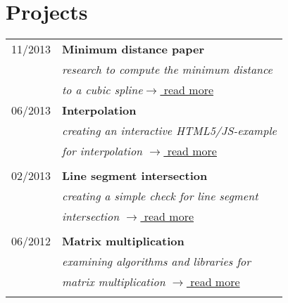 \documentclass[a4paper,10pt]{article} %
\begin{document}
{\begin{minipage}[t]{0.5\textwidth}
\end{minipage} %
\hfill
\begin{minipage}[t]{0.44\textwidth} 
\vspace{0pt} %


\section{Projects} 

\begin{tabular}{rl}
11/2013	 & \textbf{Minimum distance paper}\\
& \textit{research to compute the minimum distance}\\
& \textit{ to a cubic spline}\hfill \href{https://github.com/MartinThoma/LaTeX-examples/tree/master/documents/math-minimal-distance-to-cubic-function}{$\rightarrow$ read more}\\

06/2013	 & \textbf{Interpolation}\\
& \textit{creating an interactive HTML5/JS-example}\\
& \textit{for interpolation} \hfill \href{http://martin-thoma.com/polynomial-interpolation/}{$\rightarrow$ read more} \\\\

02/2013	 & \textbf{Line segment intersection}\\
& \textit{creating a simple check for line segment}\\
& \textit{intersection} \hfill \href{http://martin-thoma.com/how-to-check-if-two-line-segments-intersect/}{$\rightarrow$ read more} \\\\

06/2012	 & \textbf{Matrix multiplication}\\
& \textit{examining algorithms and libraries for}\\
& \textit{matrix multiplication} \hfill \href{http://martin-thoma.com/matrix-multiplication-python-java-cpp/}{$\rightarrow$ read more}\\\\


\end{tabular}
\end{minipage}}
\end{document}
